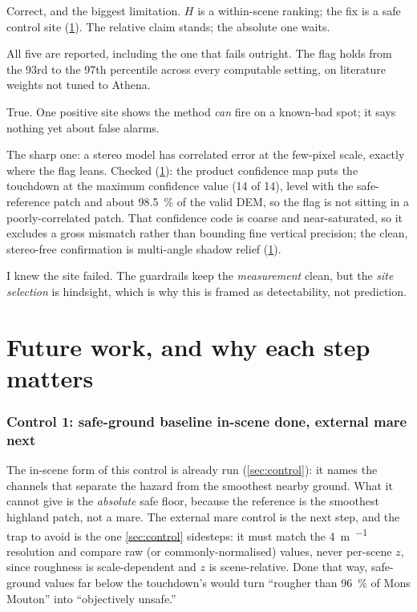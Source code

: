 \documentclass[11pt]{article}
\begin{document}
\begin{description}[leftmargin=0pt,style=unboxed,itemsep=3pt]
\item[``96th percentile of a terrible neighbourhood is not an absolute hazard.'']
Correct, and the biggest limitation. $H$ is a within-scene ranking; the fix is a safe
control site (\cref{sec:future}). The relative claim stands; the absolute one waits.
\item[``You tried five settings; that is fishing.''] All five are reported, including
the one that fails outright. The flag holds from the 93rd to the 97th percentile
across every computable setting, on literature weights not tuned to Athena.
\item[``$n=1$, no controls.''] True. One positive site shows the method \emph{can}
fire on a known-bad spot; it says nothing yet about false alarms.
\item[``Fine-scale roughness on a stereo model might be matching noise.''] The sharp
one: a stereo model has correlated error at the few-pixel scale, exactly where the flag
leans. Checked (\cref{sec:future}): the product confidence map \autocite{henriksen2017}
puts the touchdown at the maximum confidence value (14 of 14), level with the
safe-reference patch and about \SI{98.5}{\percent} of the valid DEM, so the flag is not
sitting in a poorly-correlated patch. That confidence code is coarse and near-saturated,
so it excludes a gross mismatch rather than bounding fine vertical precision; the clean,
stereo-free confirmation is multi-angle shadow relief (\cref{sec:future}).
\item[``Circularity.''] I knew the site failed. The guardrails keep the
\emph{measurement} clean, but the \emph{site selection} is hindsight, which is why
this is framed as detectability, not prediction.
\end{description}

\section{Future work, and why each step matters}
\label{sec:future}

\subsubsection{Control 1: safe-ground baseline \textemdash{} in-scene done, external mare next}
The in-scene form of this control is already run (\cref{sec:control}): it names the
channels that separate the hazard from the smoothest nearby ground. What it cannot give
is the \emph{absolute} safe floor, because the reference is the smoothest highland
patch, not a mare. The external mare control is the next step, and the trap to avoid is
the one \cref{sec:control} sidesteps: it must match the \SI{4}{\meter\per\px} resolution
and compare raw (or commonly-normalised) values, never per-scene $z$, since roughness is
scale-dependent \autocite{caifa2020} and $z$ is scene-relative. Done that way,
safe-ground values far below the touchdown's would turn ``rougher than
\SI{96}{\percent} of Mons Mouton'' into ``objectively unsafe.''
\end{document}
